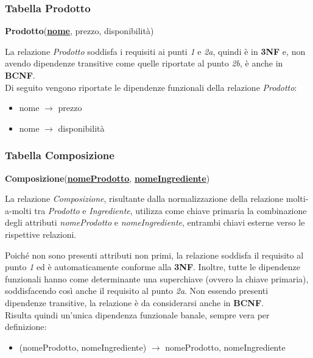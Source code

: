 \documentclass[12pt,a4paper]{article}
\begin{document}
    \subsubsection*{Tabella Prodotto}
    \begin{tcolorbox}[
        colback=gray!8,
        colframe=black!30,
        title=
    ]
        \textbf{Prodotto}(\textbf{\uline{nome}}, prezzo, disponibilità)
    \end{tcolorbox}
    
    \noindent
    La relazione \textit{Prodotto} soddisfa i requisiti ai punti \textit{1} e \textit{2a}, quindi è in \textbf{3NF} e, non avendo dipendenze transitive come quelle riportate al punto \textit{2b}, è anche in \textbf{BCNF}.\\
    Di seguito vengono riportate le dipendenze funzionali della relazione \textit{Prodotto}:
    \begin{itemize}[leftmargin=1em, label=$\circ$]
        \item nome $\rightarrow$ prezzo
        \item nome $\rightarrow$ disponibilità
    \end{itemize}


    \subsubsection*{Tabella Composizione}
    \begin{tcolorbox}[
        colback=gray!8,
        colframe=black!30,
        title=
    ]
        \textbf{Composizione}(\textbf{\uline{nomeProdotto}}, \textbf{\uline{nomeIngrediente}})
    \end{tcolorbox}
    
    \noindent
    La relazione \textit{Composizione}, risultante dalla normalizzazione della relazione molti-a-molti tra \textit{Prodotto} e \textit{Ingrediente}, utilizza come chiave primaria la combinazione degli attributi \textit{nomeProdotto} e \textit{nomeIngrediente}, entrambi chiavi esterne verso le rispettive relazioni.
    
    \vspace{8pt}
    \noindent
    Poiché non sono presenti attributi non primi, la relazione soddisfa il requisito al punto \textit{1} ed è automaticamente conforme alla \textbf{3NF}. Inoltre, tutte le dipendenze funzionali hanno come determinante una superchiave (ovvero la chiave primaria), soddisfacendo così anche il requisito al punto \textit{2a}. Non essendo presenti dipendenze transitive, la relazione è da considerarsi anche in \textbf{BCNF}.\\
    Risulta quindi un'unica dipendenza funzionale banale, sempre vera per definizione:
    \begin{itemize}[leftmargin=1em, label=$\circ$]
        \item (nomeProdotto, nomeIngrediente) $\rightarrow$ nomeProdotto, nomeIngrediente
    \end{itemize}
\end{document}
